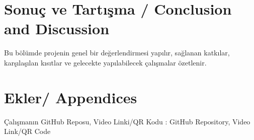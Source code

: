 \documentclass[11pt,a4paper]{article}
\begin{document}
\section{Sonuç ve Tartışma / Conclusion and Discussion}
\label{sec:sonuc_tartisma}
Bu bölümde projenin genel bir değerlendirmesi yapılır, sağlanan katkılar, karşılaşılan kısıtlar ve gelecekte yapılabilecek çalışmalar özetlenir.

\newpage
\renewcommand{\bibname}{References / Kaynakça}



\newpage
\appendix
\section{Ekler/ Appendices}
Çalışmanın GitHub Reposu, Video Linki/QR Kodu : GitHub Repository, Video Link/QR Code
\end{document}
